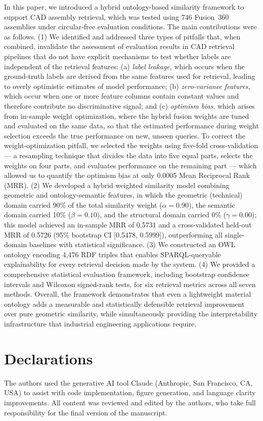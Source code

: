 \documentclass[preprint,12pt]{elsarticle}
\begin{document}
In this paper, we introduced a hybrid ontology-based similarity framework to support CAD assembly retrieval, which was tested using 746 Fusion~360 assemblies under circular-free evaluation conditions.
The main contributions were as follows.
(1) We identified and addressed three types of pitfalls that, when combined, invalidate the assessment of evaluation results in CAD retrieval pipelines that do not have explicit mechanisms to test whether labels are independent of the retrieval features: (a) \emph{label leakage}, which occurs when the ground-truth labels are derived from the same features used for retrieval, leading to overly optimistic estimates of model performance; (b) \emph{zero-variance features}, which occur when one or more feature columns contain constant values and therefore contribute no discriminative signal; and (c) \emph{optimism bias}, which arises from in-sample weight optimization, where the hybrid fusion weights are tuned and evaluated on the same data, so that the estimated performance during weight selection exceeds the true performance on new, unseen queries.
To correct the weight-optimization pitfall, we selected the weights using five-fold cross-validation --- a resampling technique that divides the data into five equal parts, selects the weights on four parts, and evaluates performance on the remaining part --- which allowed us to quantify the optimism bias at only 0.0005 Mean Reciprocal Rank (MRR).
(2) We developed a hybrid weighted similarity model combining geometric and ontology-semantic features, in which the geometric (technical) domain carried 90\% of the total similarity weight ($\alpha{=}0.90$), the semantic domain carried 10\% ($\beta{=}0.10$), and the structural domain carried 0\% ($\gamma{=}0.00$); this model achieved an in-sample MRR of 0.5731 and a cross-validated held-out MRR of 0.5726 (95\% bootstrap CI [0.5478, 0.5999]), outperforming all single-domain baselines with statistical significance.
(3) We constructed an OWL ontology encoding 4,476 RDF triples that enables SPARQL-queryable explainability for every retrieval decision made by the system.
(4) We provided a comprehensive statistical evaluation framework, including bootstrap confidence intervals and Wilcoxon signed-rank tests, for six retrieval metrics across all seven methods.
Overall, the framework demonstrates that even a lightweight material ontology adds a measurable and statistically defensible retrieval improvement over pure geometric similarity, while simultaneously providing the interpretability infrastructure that industrial engineering applications require.

\section*{Declarations}

The authors used the generative AI tool Claude (Anthropic, San Francisco, CA, USA) to assist with code implementation, figure generation, and language clarity improvements.
All content was reviewed and edited by the authors, who take full responsibility for the final version of the manuscript.



\end{document}
